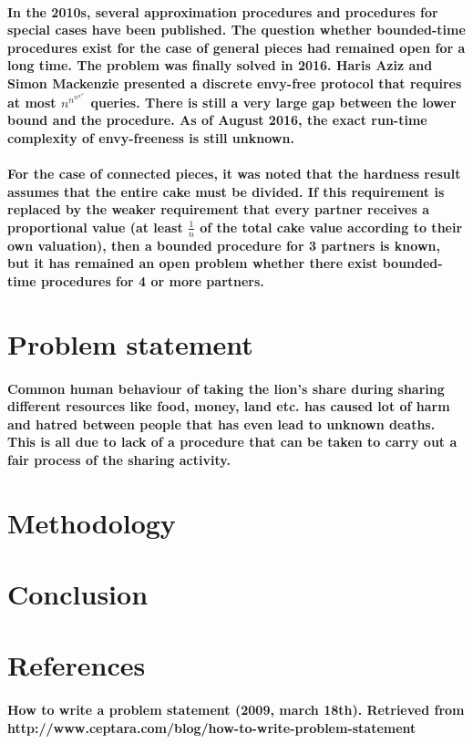 \documentclass[12pt]{report}
\begin{document}
	\paragraph{In the 2010s, several approximation procedures and procedures for special cases have been published. The question whether bounded-time procedures exist for the case of general pieces had remained open for a long time. The problem was finally solved in 2016. Haris Aziz and Simon Mackenzie presented a discrete envy-free protocol that requires \\
		at most ${\displaystyle n^{n^{n^{n^{n^{n}}}}}}$ queries. There is still a very large gap between the lower bound and the procedure. As of August 2016, the exact run-time complexity of envy-freeness is still unknown. }
	\paragraph{For the case of connected pieces, it was noted that the hardness result assumes that the entire cake must be divided. If this requirement is replaced by the weaker requirement that every partner receives a proportional value (at least $\frac{1}{n}$ of the total cake value according to their own valuation), then a bounded procedure for 3 partners is known, but it has remained an open problem whether there exist bounded-time procedures for 4 or more partners.
	}
	\section{Problem statement}
	\paragraph{Common human behaviour of taking the lion's share during sharing different resources like food, money, land etc. has caused lot of harm and hatred between people that has even lead to unknown deaths. This is all due to lack of a procedure that can be taken to carry out a fair process of the sharing activity. }

	\section{Methodology}
	\paragraph{}
	\section{Conclusion}
	\section{References}
	\paragraph{How to write a problem statement (2009, march 18th). Retrieved from   http://www.ceptara.com/blog/how-to-write-problem-statement}
	
	
\end{document}
